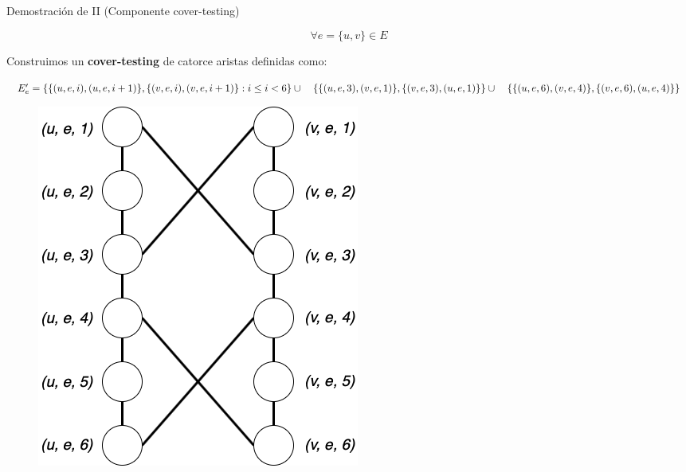 \documentclass{beamer}
\begin{document}
\begin{frame}{Demostración de II (Componente cover-testing)}
    \begin{block}{}
        \[\forall e = \{u, v\} \in E\]
    \end{block}
    Construimos un \textbf{cover-testing} de catorce aristas definidas como:
    \begin{center}
        \begin{math}
            E'_e = \{\{(u,e,i), (u,e, i+1)\},\{(v,e,i),(v,e,i+1)\} : i \le i < 6\} \\
            \cup \quad \{\{(u,e,3), (v,e,1)\},\{(v,e,3),(u,e,1)\}\} \\
            \cup \quad \{\{(u,e,6), (v,e,4)\},\{(v,e,6),(u,e,4)\}\}
        \end{math}
    \end{center}
    \begin{figure}
        \centering
        \includegraphics[scale=0.25]{images/cover-testing-2.png}
        \label{fig:my_label}
    \end{figure}
\end{frame}
\end{document}
